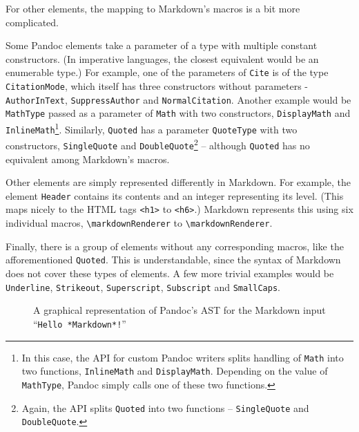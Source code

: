 \documentclass[
  digital,     %
  oneside,     %
  nosansbold,  %
  nocolorbold, %
  lof,         %
  lot,         %
]{fithesis4}
\newcommand\macro[1]{\texttt{\textbackslash{}{#1}}}
\newcommand\renderer[1]{\macro{markdown\-Renderer\-{#1}}}
\begin{document}
For other elements, the mapping to Markdown's macros is a bit more complicated.

Some Pandoc elements take a parameter of a type with multiple constant constructors. (In imperative languages, the closest equivalent would be an enumerable type.) For example, one of the parameters of \texttt{Cite} is of the type \texttt{CitationMode}, which itself has three constructors without parameters - \texttt{AuthorInText}, \texttt{SuppressAuthor} and \texttt{NormalCitation}. Another example would be \texttt{MathType} passed as a parameter of \texttt{Math} with two constructors, \texttt{DisplayMath} and \texttt{InlineMath}\footnote{In this case, the API for custom Pandoc writers splits handling of \texttt{Math} into two functions, \texttt{InlineMath} and \texttt{DisplayMath}. Depending on the value of \texttt{MathType}, Pandoc simply calls one of these two functions.}. Similarly, \texttt{Quoted} has a parameter \texttt{QuoteType} with two constructors, \texttt{SingleQuote} and \texttt{DoubleQuote}\footnote{Again, the API splits \texttt{Quoted} into two functions -- \texttt{SingleQuote} and \texttt{DoubleQuote}.} -- although \texttt{Quoted} has no equivalent among Markdown's macros.

Other elements are simply represented differently in Markdown. For example, the element \texttt{Header} contains its contents and an integer representing its level. (This maps nicely to the HTML tags \texttt{<h1>} to \texttt{<h6>}.) Markdown represents this using six individual macros, \renderer{HeadingOne} to \renderer{HeadingSix}.

Finally, there is a group of elements without any corresponding macros, like the afforementioned \texttt{Quoted}. This is understandable, since the syntax of Markdown does not cover these types of elements. A few more trivial examples would be \texttt{Underline}, \texttt{Strikeout}, \texttt{Superscript}, \texttt{Subscript} and \texttt{SmallCaps}.

\begin{figure}
  \centering
  \caption{A graphical representation of Pandoc's AST for the Markdown input ``\texttt{Hello *Markdown*!}''}
  \label{fig:pandoc-ast}
\end{figure}
\end{document}
